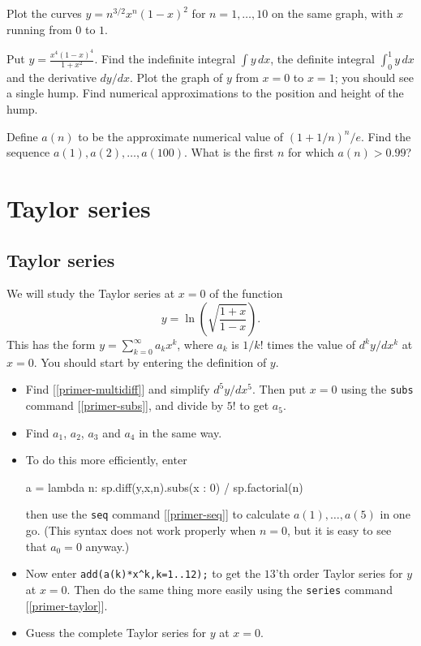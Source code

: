 \documentclass[a4paper,10pt]{amsbook}
\begin{document}
\begin{exercise}
 Plot the curves $y=n^{3/2}x^n(1-x)^2$ for $n=1,\dotsc,10$ on the same
 graph, with $x$ running from $0$ to $1$.  
\end{exercise}

\begin{exercise}
 Put $\displaystyle y=\frac{x^4(1-x)^4}{1+x^2}$.  Find the
 indefinite integral $\int y\,dx$, the definite integral
 $\int_0^1 y\,dx$ and the derivative $dy/dx$.  Plot the
 graph of $y$ from $x=0$ to $x=1$; you should see a single
 hump.  Find numerical approximations to the position and
 height of the hump.
\end{exercise}

\begin{exercise}
 Define $a(n)$ to be the approximate numerical value of
 $(1+1/n)^n/e$.  Find the sequence
 $a(1),a(2),\dotsc,a(100)$.  What is the first $n$ for which
 $a(n)>0.99$? 
\end{exercise}

\chapter{Taylor series}

\section{Taylor series}\label{sec-taylor}

\begin{exercise}\label{ex-ln}
 We will study the Taylor series at $x=0$ of the function 
 \[ y = \ln\left(\sqrt{\frac{1+x}{1-x}}\right).  \]
 This has the form $y=\sum_{k=0}^\infty a_kx^k$, where $a_k$
 is $1/k!$ times the value of $d^ky/dx^k$ at $x=0$.  You
 should start by entering the definition of $y$.
 \begin{itemize}
  \item[(a)] Find [\ref{primer-multidiff}] and simplify
   $d^5y/dx^5$.  Then put $x=0$ using the \verb~subs~
   command [\ref{primer-subs}], and divide by $5!$ to get $a_5$.
  \item[(b)] Find $a_1$, $a_2$, $a_3$ and $a_4$ in the
   same way.
  \item[(c)] To do this more efficiently, enter 
\begin{pcodeblock}
 a = lambda n: sp.diff(y,x,n).subs({x : 0}) / sp.factorial(n)
\end{pcodeblock}
   then use the \verb~seq~ command [\ref{primer-seq}] to
   calculate $a(1),\dotsc,a(5)$ in one go.  (This syntax does not
   work properly when $n=0$, but it is easy to see that
   $a_0=0$ anyway.)
  \item[(d)] Now enter \verb~add(a(k)*x^k,k=1..12);~ to get
   the $13$'th order Taylor series for $y$ at $x=0$.  Then do the
   same thing more easily using the \verb~series~ command
   [\ref{primer-taylor}]. 
  \item[(e)] Guess the complete Taylor series for $y$ at $x=0$.
 \end{itemize}
\end{exercise}
\end{document}
